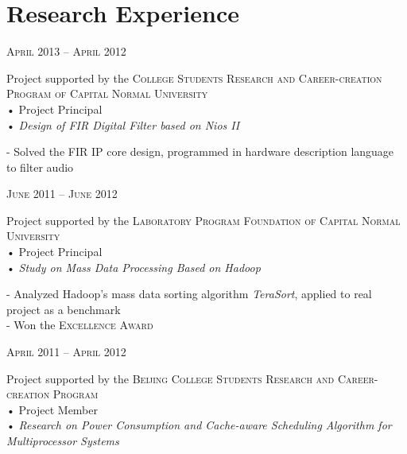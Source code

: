 \documentclass[10pt,a4paper]{article} %
\begin{document}
\begin{minipage}[t]{0.5\textwidth}
\section{Research Experience}

{\raggedleft\textsc{April 2013 -- April 2012}\par}

{\raggedright Project supported by the \textsc{College Students Research and Career-creation Program of Capital Normal University}\\
 • Project Principal\\
 • \textit{Design of FIR Digital Filter based on Nios II}\\}

\normalsize{
-  Solved the FIR IP core design, programmed in hardware description language to filter audio
}\\

{\raggedleft\textsc{June 2011 -- June 2012}\par}

{\raggedright Project supported by the \textsc{Laboratory Program Foundation of Capital Normal University}\\
 • Project Principal\\
 • \textit{Study on Mass Data Processing Based on Hadoop}\\}

\normalsize{
-  Analyzed Hadoop's mass data sorting algorithm \textit{TeraSort}, applied to real project as a benchmark\\
-  Won the \textsc{Excellence Award}}\\


{\raggedleft\textsc{April 2011 -- April 2012}\par}

{\raggedright Project supported by the \textsc{Beijing College Students Research and Career-creation Program} \\
 • Project Member\\
 • \textit{Research on Power Consumption and Cache-aware Scheduling Algorithm for Multiprocessor Systems}\\}


\end{minipage}
\end{document}
